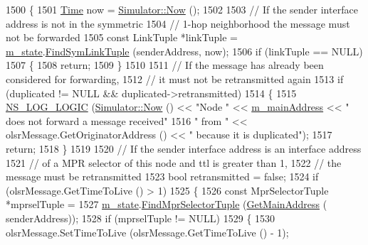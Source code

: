 \begin{DoxyCode}
1500 \{
1501   \hyperlink{namespacens3_1_1TracedValueCallback_a7ffd3e7c142ffe7c8a1d2db9b8de38ec}{Time} now = \hyperlink{classns3_1_1Simulator_ac3178fa975b419f7875e7105be122800}{Simulator::Now} ();
1502 
1503   \textcolor{comment}{// If the sender interface address is not in the symmetric}
1504   \textcolor{comment}{// 1-hop neighborhood the message must not be forwarded}
1505   \textcolor{keyword}{const} LinkTuple *linkTuple = \hyperlink{classns3_1_1olsr_1_1RoutingProtocol_a07942ec1a7df71b609c8d2ff3b567c49}{m\_state}.\hyperlink{classns3_1_1olsr_1_1OlsrState_a5005529fbbd5fa4a015591a93d715890}{FindSymLinkTuple} (senderAddress, now);
1506   \textcolor{keywordflow}{if} (linkTuple == NULL)
1507     \{
1508       \textcolor{keywordflow}{return};
1509     \}
1510 
1511   \textcolor{comment}{// If the message has already been considered for forwarding,}
1512   \textcolor{comment}{// it must not be retransmitted again}
1513   \textcolor{keywordflow}{if} (duplicated != NULL && duplicated->retransmitted)
1514     \{
1515       \hyperlink{group__logging_ga88acd260151caf2db9c0fc84997f45ce}{NS\_LOG\_LOGIC} (\hyperlink{classns3_1_1Simulator_ac3178fa975b419f7875e7105be122800}{Simulator::Now} () << \textcolor{stringliteral}{"Node "} << 
      \hyperlink{classns3_1_1olsr_1_1RoutingProtocol_a58cc50ed5d1039aab603e90e318aabfb}{m\_mainAddress} << \textcolor{stringliteral}{" does not forward a message received"}
1516                     \textcolor{stringliteral}{" from "} << olsrMessage.GetOriginatorAddress () << \textcolor{stringliteral}{" because it is duplicated"});
1517       \textcolor{keywordflow}{return};
1518     \}
1519 
1520   \textcolor{comment}{// If the sender interface address is an interface address}
1521   \textcolor{comment}{// of a MPR selector of this node and ttl is greater than 1,}
1522   \textcolor{comment}{// the message must be retransmitted}
1523   \textcolor{keywordtype}{bool} retransmitted = \textcolor{keyword}{false};
1524   \textcolor{keywordflow}{if} (olsrMessage.GetTimeToLive () > 1)
1525     \{
1526       \textcolor{keyword}{const} MprSelectorTuple *mprselTuple =
1527         \hyperlink{classns3_1_1olsr_1_1RoutingProtocol_a07942ec1a7df71b609c8d2ff3b567c49}{m\_state}.\hyperlink{classns3_1_1olsr_1_1OlsrState_a81bb1e9642f6b840094d199d3654b984}{FindMprSelectorTuple} (\hyperlink{classns3_1_1olsr_1_1RoutingProtocol_ae01451170fb389d322b33ed6d954f460}{GetMainAddress} (
      senderAddress));
1528       \textcolor{keywordflow}{if} (mprselTuple != NULL)
1529         \{
1530           olsrMessage.SetTimeToLive (olsrMessage.GetTimeToLive () - 1);

\end{DoxyCode}
